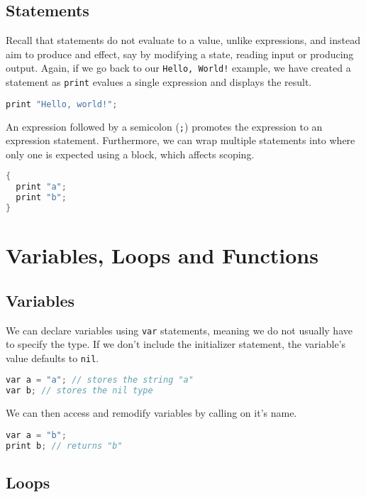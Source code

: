 \subsection{Statements}

Recall that statements do not evaluate to a value, unlike expressions, and instead aim to produce and effect, say by modifying a state, reading input or producing output. Again, if we go back to our \verb+Hello, World!+ example, we have created a statement as \verb+print+ evalues a single expression and displays the result. 

\begin{lstlisting}[language=C]
print "Hello, world!";
\end{lstlisting}

An expression followed by a semicolon (\verb+;+) promotes the expression to an expression statement. Furthermore, we can wrap multiple statements into where only one is expected using a block, which affects scoping. 

\begin{lstlisting}[language=C]
{
  print "a";
  print "b";
}
\end{lstlisting}

\section{Variables, Loops and Functions}

\subsection{Variables}

We can declare variables using \verb+var+ statements, meaning we do not usually have to specify the type. If we don't include the initializer statement, the variable’s value defaults to \verb+nil+.

\begin{lstlisting}[language=C]
var a = "a"; // stores the string "a"
var b; // stores the nil type
\end{lstlisting}

We can then access and remodify variables by calling on it's name.

\begin{lstlisting}[language=C]
var a = "b"; 
print b; // returns "b"
\end{lstlisting}

\subsection{Loops}

